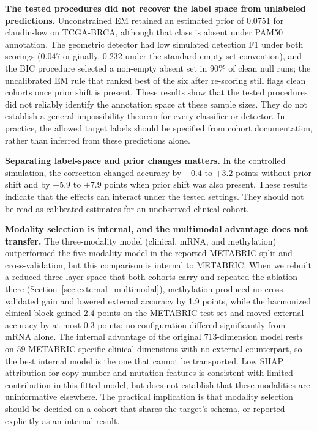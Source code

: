 \documentclass[10pt,journal,compsoc,twocolumn]{IEEEtran}
\begin{document}
\textbf{The tested procedures did not recover the label space from unlabeled predictions.} Unconstrained EM retained an estimated prior of 0.0751 for claudin-low on TCGA-BRCA, although that class is absent under PAM50 annotation. The geometric detector had low simulated detection F1 under both scorings ($0.047$ originally, $0.232$ under the standard empty-set convention), and the BIC procedure selected a non-empty absent set in 90\% of clean null runs; the uncalibrated EM rule that ranked best of the six after re-scoring still flags clean cohorts once prior shift is present. These results show that the tested procedures did not reliably identify the annotation space at these sample sizes. They do not establish a general impossibility theorem for every classifier or detector. In practice, the allowed target labels should be specified from cohort documentation, rather than inferred from these predictions alone.

\textbf{Separating label-space and prior changes matters.} In the controlled simulation, the correction changed accuracy by $-0.4$ to $+3.2$ points without prior shift and by $+5.9$ to $+7.9$ points when prior shift was also present. These results indicate that the effects can interact under the tested settings. They should not be read as calibrated estimates for an unobserved clinical cohort.

\textbf{Modality selection is internal, and the multimodal advantage does not transfer.} The three-modality model (clinical, mRNA, and methylation) outperformed the five-modality model in the reported METABRIC split and cross-validation, but this comparison is internal to METABRIC. When we rebuilt a reduced three-layer space that both cohorts carry and repeated the ablation there (Section~\ref{sec:external_multimodal}), methylation produced no cross-validated gain and lowered external accuracy by 1.9 points, while the harmonized clinical block gained 2.4 points on the METABRIC test set and moved external accuracy by at most 0.3 points; no configuration differed significantly from mRNA alone. The internal advantage of the original 713-dimension model rests on 59 METABRIC-specific clinical dimensions with no external counterpart, so the best internal model is the one that cannot be transported. Low SHAP attribution for copy-number and mutation features is consistent with limited contribution in this fitted model, but does not establish that these modalities are uninformative elsewhere. The practical implication is that modality selection should be decided on a cohort that shares the target's schema, or reported explicitly as an internal result.
\end{document}
